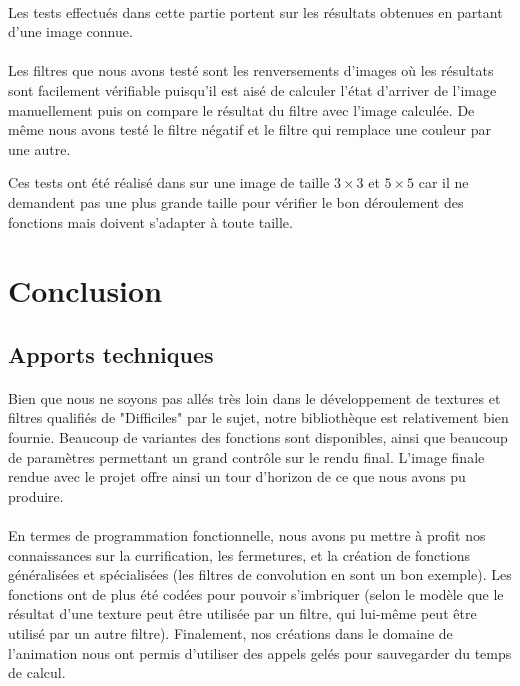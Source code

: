 \documentclass[a4paper]{article}
\begin{document}
\paragraph{}
Les tests effectués dans cette partie portent sur les résultats obtenues en partant d'une image connue.

\paragraph{}
Les filtres que nous avons testé sont les renversements d'images où les résultats sont facilement vérifiable puisqu'il est aisé de calculer l'état d'arriver de l'image manuellement puis on compare le résultat du filtre avec l'image calculée. De même nous avons testé le filtre négatif et le filtre qui remplace une couleur par une autre.

Ces tests ont été réalisé dans sur une image de taille $3 \times 3$ et $5 \times 5$ car il ne demandent pas une plus grande taille pour vérifier le bon déroulement des fonctions mais doivent s'adapter à toute taille.

\section{Conclusion}

\subsection{Apports techniques}
\label{sec:technic}

\paragraph{}
Bien que nous ne soyons pas allés très loin dans le développement de textures et filtres qualifiés de "Difficiles" par le sujet, notre bibliothèque est relativement bien fournie. Beaucoup de variantes des fonctions sont disponibles, ainsi que beaucoup de paramètres permettant un grand contrôle sur le rendu final. L'image finale rendue avec le projet offre ainsi un tour d'horizon de ce que nous avons pu produire.

\paragraph{}
En termes de programmation fonctionnelle, nous avons pu mettre à profit nos connaissances sur la currification, les fermetures, et la création de fonctions généralisées et spécialisées (les filtres de convolution en sont un bon exemple). Les fonctions ont de plus été codées pour pouvoir s'imbriquer (selon le modèle que le résultat d'une texture peut être utilisée par un filtre, qui lui-même peut être utilisé par un autre filtre). Finalement, nos créations dans le domaine de l'animation nous ont permis d'utiliser des appels gelés pour sauvegarder du temps de calcul.
\end{document}
